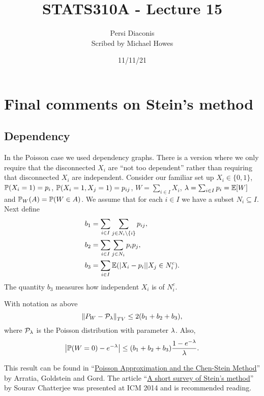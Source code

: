 



\newcommand{\s}{s}


\title{STATS310A - Lecture 15}
\author{Persi Diaconis\\ Scribed by Michael Howes}
\date{11/11/21}

\pagestyle{fancy}
\fancyhf{}


\maketitle
\tableofcontents
\section{Final comments on Stein's method}
\subsection{Dependency}
In the Poisson case we used dependency graphs. There is a version where we only require that the disconnected $X_i$ are ``not too dependent'' rather than requiring that disconnected $X_i$ are independent. Consider our familiar set up $X_i \in \{0,1\}$, ${\mathbb{P}}(X_i=1)=p_i$, ${\mathbb{P}}(X_i=1,X_j=1)=p_{ij}$, $W = \sum_{i \in I} X_i$, $\lambda = \sum_{i \in I}p_i = {\mathbb{E}}[W]$ and ${\mathbb{P}}_W(A) = {\mathbb{P}}(W \in A)$. We assume that for each $i \in I$ we have a subset $N_i \subseteq I$. Next define
\begin{align*}
    b_1 &= \sum_{i \in I}\sum_{j \in N_i\setminus \{i\}} p_{ij},\\
    b_2 &=\sum_{i\in I}\sum_{j \in N_i} p_ip_j,\\
    b_3 &= \sum_{i \in I} {\mathbb{E}}({\left\lvert X_i-p_i\right\rvert}|X_j \in N_i^c).
\end{align*}
The quantity $b_3$ measures how independent $X_i$ is of $N_i^c$. 
\begin{thrm}
    With notation as above
    \[\left\|P_W-{\mathcal{P}}_\lambda\right\|_{TV} \le 2(b_1+b_2+b_3),\]
    where ${\mathcal{P}}_\lambda$ is the Poisson distribution with parameter $\lambda$. Also,
    \[{\left\lvert{\mathbb{P}}(W=0)-e^{-\lambda}\right\rvert} \le (b_1+b_2+b_3)\frac{1-e^{-\lambda}}{\lambda}.\]
\end{thrm}
This result can be found in ``\href{https://projecteuclid.org/journals/statistical-science/volume-5/issue-4/Poisson-Approximation-and-the-Chen-Stein-Method/10.1214/ss/1177012015.full}{Poisson Approximation and the Chen-Stein Method}'' by Arratia, Goldstein and Gord. The article ``\href{https://arxiv.org/abs/1404.1392}{A short survey of Stein's method}'' by Sourav Chatterjee was presented at ICM 2014 and is recommended reading.
